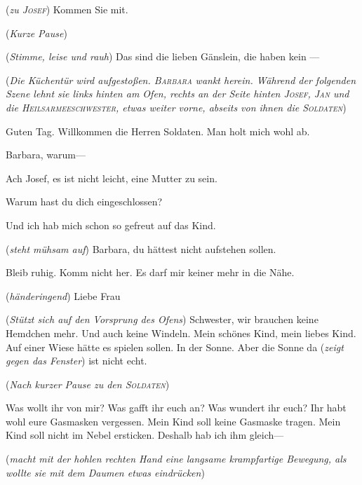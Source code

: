 \documentclass[
	final,
	a4paper,
	ngerman,
	mpinclude = true, %
	twoside = true,
	open = right,
	cleardoublepage = plain,
	DIV = 13,
	BCOR = 1cm,
	titlepage = firstiscover,
	]{scrbook}
\newcommand{\direction}[1]{(\textit{#1})}
\newcommand{\thecharacter}[1]{\textup{\textsc{#1}}\xspace}
\newcommand{\theBarbara}{\thecharacter{Barbara}}
\newcommand{\theJosef}{\thecharacter{Josef}}
\newcommand{\theJan}{\thecharacter{Jan}}
\newcommand{\theHeilsarmeeschwester}{\thecharacter{Heilsarmeeschwester}}
\newcommand{\theSoldaten}{\thecharacter{Soldaten}}
\newcommand{\character}[1]{\item[#1]}
\newcommand{\Barbara}{\character{\theBarbara}}
\newcommand{\Josef}{\character{\theJosef}}
\newcommand{\Heilsarmeeschwester}{\character{Schwester}}
\begin{document}
\begin{play}
\direction{zu \theJosef} Kommen Sie mit.

\direction{Kurze Pause}

\Barbara
\direction{Stimme, leise und rauh} Das sind die lieben Gänslein, die haben kein ---

\direction{Die Küchentür wird aufgestoßen. \theBarbara wankt herein. Während der folgenden Szene lehnt sie links hinten am Ofen, rechts an der Seite hinten \theJosef, \theJan und die \theHeilsarmeeschwester, etwas weiter vorne, abseits von ihnen die \theSoldaten}

\Barbara
Guten Tag. Willkommen die Herren Soldaten. Man holt mich wohl ab.

\Josef
Barbara, warum---

\Barbara
Ach Josef, es ist nicht leicht, eine Mutter zu sein.

\Josef
Warum hast du dich eingeschlossen?

\Barbara
Und ich hab mich schon so gefreut auf das Kind.

\Josef
\direction{steht mühsam auf} Barbara, du hättest nicht aufstehen sollen.

\Barbara
Bleib ruhig. Komm nicht her. Es darf mir keiner mehr in die Nähe.

\Heilsarmeeschwester
\direction{händeringend} Liebe Frau

\Barbara
\direction{Stützt sich auf den Vorsprung des Ofens} Schwester, wir brauchen keine Hemdchen mehr. Und auch keine Windeln. Mein schönes Kind, mein liebes Kind. Auf einer Wiese hätte es spielen sollen. In der Sonne. Aber die Sonne da \direction{zeigt gegen das Fenster} ist nicht echt.

\direction{Nach kurzer Pause zu den \theSoldaten}

Was wollt ihr von mir? Was gafft ihr euch an? Was wundert ihr euch? Ihr habt wohl eure Gasmasken vergessen. Mein Kind soll keine Gasmaske tragen. Mein Kind soll nicht im Nebel ersticken. Deshalb hab ich ihm gleich---

\direction{macht mit der hohlen rechten Hand eine langsame krampfartige Bewegung, als wollte sie mit dem Daumen etwas eindrücken}

\end{play}
\end{document}
